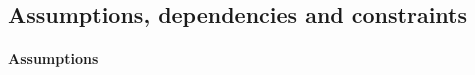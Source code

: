 \documentclass[12pt,titlepage]{article}
\begin{document}
\subsection{Assumptions, dependencies and constraints}\label{sec:mod1}
\paragraph{Assumptions}
\begin{itemize}

\end{itemize}
\end{document}
